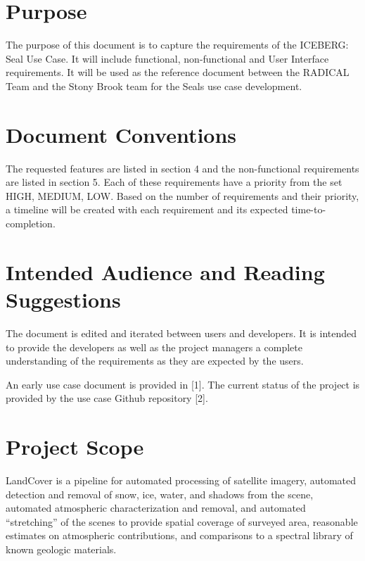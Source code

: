 \documentclass{scrreprt}
\begin{document}
\section{Purpose}
The purpose of this document is to capture the requirements of the ICEBERG: Seal
Use Case. It will include functional, non-functional and User Interface requirements.
It will be used as the reference document between the RADICAL Team and the Stony 
Brook team for the Seals use case development.

\section{Document Conventions}
The requested features are listed in section 4 and the non-functional requirements are
listed in section 5. Each of these requirements have a priority from the set {HIGH,
MEDIUM, LOW}. Based on the number of requirements and their priority, a timeline
will be created with each requirement and its expected time-to-completion.

\section{Intended Audience and Reading Suggestions}

The document is edited and iterated between users and developers. It is intended
to provide the developers as well as the project managers a complete understanding 
of the requirements as they are expected by the users.

An early use case document is provided in [1]. The current status of the project is
provided by the use case Github repository [2].

\section{Project Scope}

LandCover is 
a pipeline for automated processing of satellite imagery, automated detection and 
removal of snow, ice, water, and shadows from the scene, automated atmospheric 
characterization and removal, and automated ``stretching'' of the scenes to provide
spatial coverage of surveyed area, reasonable estimates on atmospheric contributions, 
and comparisons to a spectral library of known geologic materials.
\end{document}
